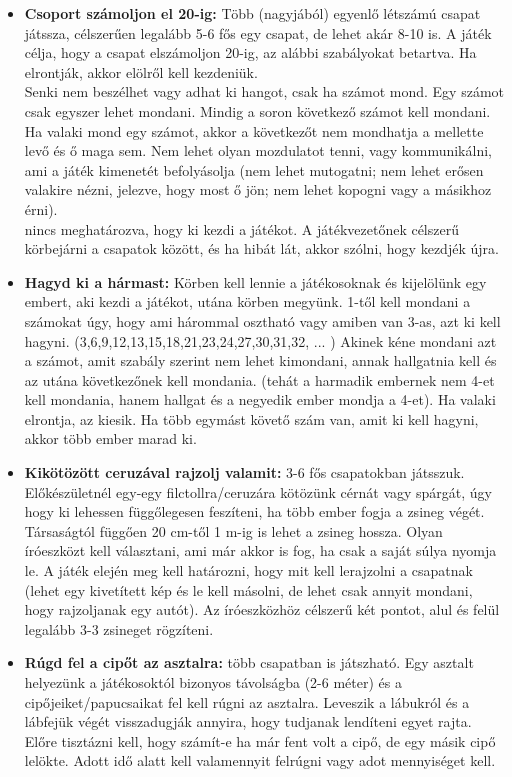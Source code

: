 \documentclass[a4paper, 12pt, twoside, openright]{article}
\begin{document}
\begin{itemize}
\item \textbf{Csoport számoljon el 20-ig:} Több (nagyjából) egyenlő létszámú csapat játssza, célszerűen legalább 5-6 fős egy csapat, de lehet akár 8-10 is. A játék célja, hogy a csapat elszámoljon 20-ig, az alábbi szabályokat betartva. Ha elrontják, akkor elölről kell kezdeniük.\\
Senki nem beszélhet vagy adhat ki hangot, csak ha számot mond. Egy számot csak egyszer lehet mondani. Mindig a soron következő számot kell mondani. Ha valaki mond egy számot, akkor a következőt nem mondhatja a mellette levő és ő maga sem. Nem lehet olyan mozdulatot tenni, vagy kommunikálni, ami a játék kimenetét befolyásolja (nem lehet mutogatni; nem lehet erősen valakire nézni, jelezve, hogy most ő jön; nem lehet kopogni vagy a másikhoz érni).\\
nincs meghatározva, hogy ki kezdi a játékot. A játékvezetőnek célszerű körbejárni a csapatok között, és ha hibát lát, akkor szólni, hogy kezdjék újra.

\item \textbf{Hagyd ki a hármast:} Körben kell lennie a játékosoknak és kijelölünk egy embert, aki kezdi a játékot, utána körben megyünk. 1-től kell mondani a számokat úgy, hogy ami hárommal osztható vagy amiben van 3-as, azt ki kell hagyni. (3,6,9,12,13,15,18,21,23,24,27,30,31,32, ... ) Akinek kéne mondani azt a számot, amit szabály szerint nem lehet kimondani, annak hallgatnia kell és az utána következőnek kell mondania. (tehát a harmadik embernek nem 4-et kell mondania, hanem hallgat és a negyedik ember mondja a 4-et). Ha valaki elrontja, az kiesik. Ha több egymást követő szám van, amit ki kell hagyni, akkor több ember marad ki.

\item \textbf{Kikötözött ceruzával rajzolj valamit:} 3-6 fős csapatokban játsszuk. Előkészületnél egy-egy filctollra/ceruzára kötözünk cérnát vagy spárgát, úgy hogy ki lehessen függőlegesen feszíteni, ha több ember fogja a zsineg végét. Társaságtól függően 20 cm-től 1 m-ig is lehet a zsineg hossza. Olyan íróeszközt kell választani, ami már akkor is fog, ha csak a saját súlya nyomja le. A játék elején meg kell határozni, hogy mit kell lerajzolni a csapatnak (lehet egy kivetített kép és le kell másolni, de lehet csak annyit mondani, hogy rajzoljanak egy autót). Az íróeszközhöz célszerű két pontot, alul és felül legalább 3-3 zsineget rögzíteni.

\item \textbf{Rúgd fel a cipőt az asztalra:} több csapatban is játszható. Egy asztalt helyezünk a játékosoktól bizonyos távolságba (2-6 méter) és a cipőjeiket/papucsaikat fel kell rúgni az asztalra. Leveszik a lábukról és a lábfejük végét visszadugják annyira, hogy tudjanak lendíteni egyet rajta. Előre tisztázni kell, hogy számít-e ha már fent volt a cipő, de egy másik cipő lelökte. Adott idő alatt kell valamennyit felrúgni vagy adot mennyiséget kell.


\end{itemize}
\end{document}

